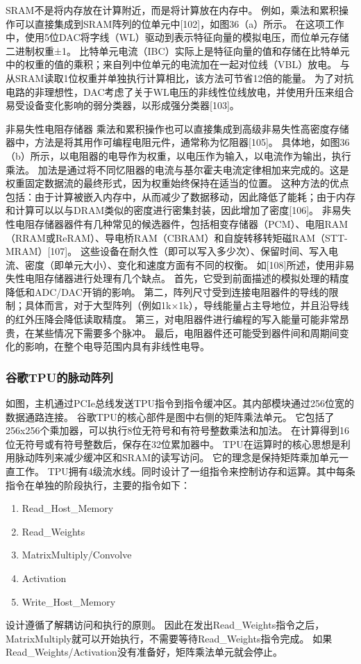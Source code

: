 SRAM不是将内存放在计算附近，而是将计算放在内存中。
例如，乘法和累积操作可以直接集成到SRAM阵列的位单元中[102]，如图36（a）所示。
在这项工作中，使用5位DAC将字线（WL）驱动到表示特征向量的模拟电压，而位单元存储二进制权重±1。
比特单元电流（IBC）实际上是特征向量的值和存储在比特单元中的权重的值的乘积；来自列中位单元的电流加在一起对位线（VBL）放电。
与从SRAM读取1位权重并单独执行计算相比，该方法可节省12倍的能量。
为了对抗电路的非理想性，DAC考虑了关于WL电压的非线性位线放电，并使用升压来组合易受设备变化影响的弱分类器，以形成强分类器[103]。

非易失性电阻存储器
乘法和累积操作也可以直接集成到高级非易失性高密度存储器中，方法是将其用作可编程电阻元件，通常称为忆阻器[105]。
具体地，如图36（b）所示，以电阻器的电导作为权重，以电压作为输入，以电流作为输出，执行乘法。
加法是通过将不同忆阻器的电流与基尔霍夫电流定律相加来完成的。这是权重固定数据流的最终形式，因为权重始终保持在适当的位置。
这种方法的优点包括：由于计算被嵌入内存中，从而减少了数据移动，因此降低了能耗；由于内存和计算可以以与DRAM类似的密度进行密集封装，因此增加了密度[106]。
非易失性电阻存储器器件有几种常见的候选器件，包括相变存储器（PCM）、电阻RAM（RRAM或ReRAM）、导电桥RAM（CBRAM）和自旋转移转矩磁RAM（STT-MRAM）[107]。
这些设备在耐久性（即可以写入多少次）、保留时间、写入电流、密度（即单元大小）、变化和速度方面有不同的权衡。
如[108]所述，使用非易失性电阻存储器进行处理有几个缺点。
首先，它受到前面描述的模拟处理的精度降低和ADC/DAC开销的影响。
第二，阵列尺寸受到连接电阻器件的导线的限制；具体而言，对于大型阵列（例如1k×1k），导线能量占主导地位，并且沿导线的红外压降会降低读取精度。
第三，对电阻器件进行编程的写入能量可能非常昂贵，在某些情况下需要多个脉冲。
最后，电阻器件还可能受到器件间和周期间变化的影响，在整个电导范围内具有非线性电导。


\subsubsection{谷歌TPU的脉动阵列}
如图，主机通过PCIe总线发送TPU指令到指令缓冲区。其内部模块通过256位宽的数据通路连接。
谷歌TPU的核心部件是图中右侧的矩阵乘法单元。
它包括了256x256个乘加器，可以执行8位无符号和有符号整数乘法和加法。
在计算得到16位无符号或有符号整数后，保存在32位累加器中。
TPU在运算时的核心思想是利用脉动阵列来减少缓冲区和SRAM的读写访问。
它的理念是保持矩阵乘加单元一直工作。
TPU拥有4级流水线。同时设计了一组指令来控制访存和运算。其中每条指令在单独的阶段执行，主要的指令如下：
\begin{enumerate}
    \item Read\_Host\_Memory
    \item Read\_Weights
    \item MatrixMultiply/Convolve
    \item Activation
    \item Write\_Host\_Memory
\end{enumerate}
设计遵循了解耦访问和执行的原则。
因此在发出Read\_Weights指令之后，MatrixMultiply就可以开始执行，不需要等待Read\_Weights指令完成。
如果Read\_Weights/Activation没有准备好，矩阵乘法单元就会停止。


